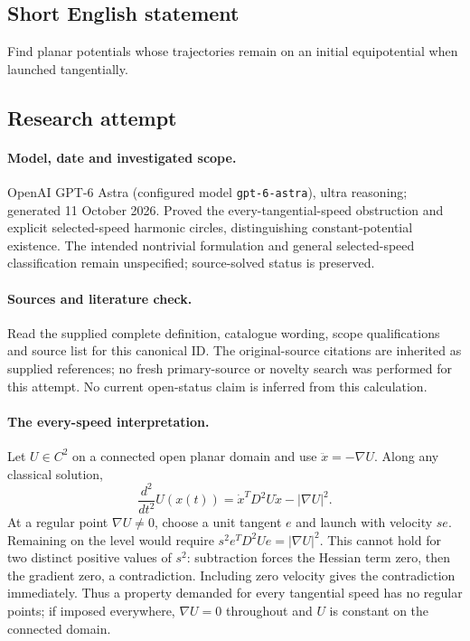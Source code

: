 \documentclass[11pt]{article}
\begin{document}
\subsection{Short English statement}
Find planar potentials whose trajectories remain on an initial equipotential when launched tangentially.
\subsection{Research attempt}
\paragraph{Model, date and investigated scope.}
OpenAI GPT-6 Astra (configured model \texttt{gpt-6-astra}), ultra reasoning; generated 11 October 2026. Proved the every-tangential-speed obstruction and explicit selected-speed harmonic circles, distinguishing constant-potential existence. The intended nontrivial formulation and general selected-speed classification remain unspecified; source-solved status is preserved.

\paragraph{Sources and literature check.}
Read the supplied complete definition, catalogue wording, scope qualifications and source list for this canonical ID. The original-source citations are inherited as supplied references; no fresh primary-source or novelty search was performed for this attempt. No current open-status claim is inferred from this calculation.

\paragraph{The every-speed interpretation.}Let \(U\in C^2\) on a connected open planar domain and use \(\ddot x=-\nabla U\). Along any classical solution,
\[\frac{d^2}{dt^2}U(x(t))=\dot x^TD^2U\dot x-|\nabla U|^2.
\]
At a regular point \(\nabla U\ne0\), choose a unit tangent \(e\) and launch with velocity \(se\). Remaining on the level would require \(s^2e^TD^2Ue=|\nabla U|^2\). This cannot hold for two distinct positive values of \(s^2\): subtraction forces the Hessian term zero, then the gradient zero, a contradiction. Including zero velocity gives the contradiction immediately. Thus a property demanded for every tangential speed has no regular points; if imposed everywhere, \(\nabla U=0\) throughout and \(U\) is constant on the connected domain.
\end{document}
